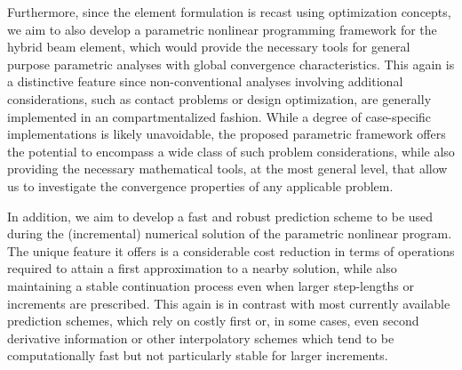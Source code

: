 Furthermore, since the element 
formulation is recast using optimization concepts, we aim to also develop a parametric 
nonlinear programming framework for the hybrid beam element, which would provide the 
necessary tools for general purpose parametric analyses with global convergence 
characteristics. This again is a distinctive feature since non-conventional 
analyses involving additional considerations, such as contact problems or 
design 
optimization, are generally implemented in an compartmentalized fashion. While 
a degree of case-specific implementations is likely unavoidable, the proposed 
parametric framework offers the potential to encompass a wide class of such 
problem considerations, while also providing the necessary mathematical tools, 
at the most general level, that allow us to investigate the convergence 
properties of any applicable problem. 

In addition, we aim to develop a fast and robust prediction scheme to 
be used during the (incremental) numerical solution of the parametric nonlinear 
program. The 
unique feature it offers is a considerable cost reduction in terms of 
operations required to attain a first approximation to a nearby solution, 
while also maintaining a stable continuation process even when larger 
step-lengths or increments are prescribed. This again is in contrast with most 
currently available
prediction schemes, which rely on costly first or, in some cases, even second 
derivative information or other interpolatory schemes which tend to be 
computationally fast but not particularly stable for larger increments.

